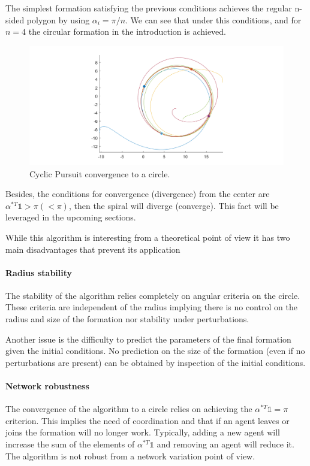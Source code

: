 The simplest formation satisfying the previous conditions achieves the regular n-sided polygon by using $\alpha_i = \pi / n$. We can see that under this conditions, and for $n=4$ the circular formation in the introduction is achieved.
\begin{figure}[h]
	\includegraphics[width=\linewidth]{Attachments/Figure21.png}
	\caption{Cyclic Pursuit convergence to a circle.}
	\label{fig:CircleConvergence}
\end{figure}

Besides, the conditions for convergence (divergence) from the center are $\alpha^{*T} \mathbb{1} > \pi ( < \pi)$, then the spiral will diverge (converge). This fact will be leveraged in the upcoming sections.

While this algorithm is interesting from a theoretical point of view it has two main disadvantages that prevent its application

\paragraph{Radius stability}
The stability of the algorithm relies completely on angular criteria on the circle. These criteria are independent of the radius implying there is no control on the radius and size of the formation nor stability under perturbations.

Another issue is the difficulty to predict the parameters of the final formation given the initial conditions. No prediction on the size of the formation (even if no perturbations are present) can be obtained by inspection of the initial conditions.

\paragraph{Network robustness}
The convergence of the algorithm to a circle relies on achieving the $\alpha^{*T} \mathbb{1} = \pi$ criterion. This implies the need of coordination and that if an agent leaves or joins the formation will no longer work. Typically, adding a new agent will increase the sum of the elements of $\alpha^{*T} \mathbb{1}$ and removing an agent will reduce it. The algorithm is not robust from a network variation point of view.

